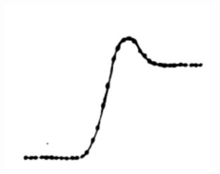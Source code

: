 \documentclass [MS] {UCLAthesis}
\begin{document}

\begin{figure}
    \centering

    \begin{subfigure}[b]{0.2\textwidth}
        \centering
        \includegraphics[width=\textwidth]{saccade_human_ori}
        \caption{}
        \label{fig:saccade_human_ori}
    \end{subfigure}
    \hfill
    \begin{subfigure}[b]{0.2\textwidth}
        \centering

\end{subfigure}
\end{figure}
\end{document}
